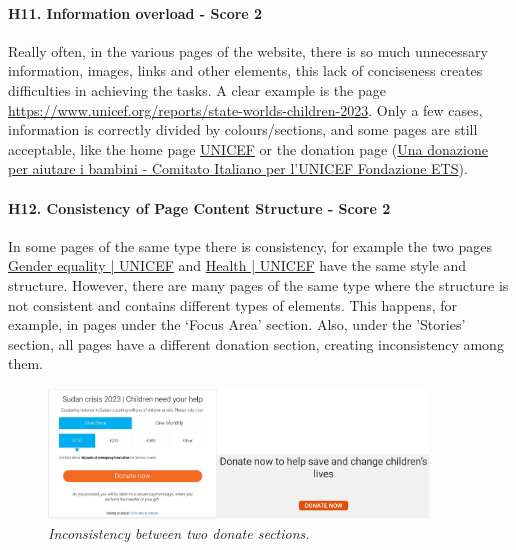 \newline
\newline \paragraph{H11. Information overload - Score 2}  \label{subsec:H11}	Really often, in the various pages of the website, there is so much unnecessary information, images, links and other elements, this lack of conciseness creates difficulties in achieving the tasks. A clear example is the page \href{https://www.unicef.org/reports/state-worlds-children-2023}{https://www.unicef.org/reports/state-worlds-children-2023}.
\newline Only a few cases, information is correctly divided by colours/sections, and some pages are still acceptable, like the home page \href{https://www.unicef.org/}{UNICEF} or the donation page (\href{https://donazioni.unicef.it}{Una donazione per aiutare i bambini - Comitato Italiano per l'UNICEF Fondazione ETS}).
\newline
\newline \paragraph{H12. Consistency of Page Content Structure - Score 2}  \label{subsec:H12}	In some pages of the same type there is consistency, for example the two pages \href{https://www.unicef.org/gender-equality}{Gender equality | UNICEF} and \href{https://www.unicef.org/health}{Health | UNICEF} have the same style and structure.
\newline However, there are many pages of the same type where the structure is not consistent and contains different types of elements. This happens, for example, in pages under the ‘Focus Area’ section.
\newline Also, under the 'Stories' section, all pages have a different donation section, creating inconsistency among them.
\begin{figure}[!h]
	\begin{center}
		\includegraphics[width=0.9\textwidth]{FinalScores16.jpg}
		\captionsetup{font=small}
		\caption{\textit{Inconsistency between two donate sections.}}
	\end{center}
\end{figure}
